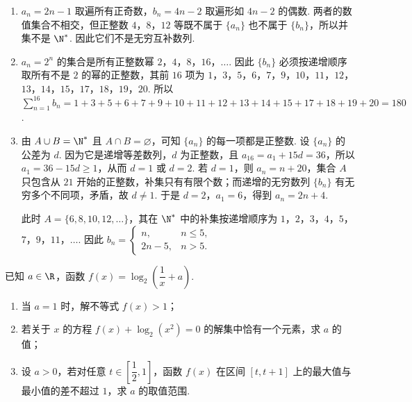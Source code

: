 \begin{solution}
\begin{enumerate}
\item \(a_n=2n-1\) 取遍所有正奇数，\(b_n=4n-2\) 取遍形如 \(4n-2\) 的偶数. 两者的数值集合不相交，但正整数 \(4\)，\(8\)，\(12\) 等既不属于 \(\{a_n\}\) 也不属于 \(\{b_n\}\)，所以并集不是 \(\N^*\). 因此它们不是无穷互补数列.
\item \(a_n=2^n\) 的集合是所有正整数幂 \(2\)，\(4\)，\(8\)，\(16\)，\(\ldots\). 因此 \(\{b_n\}\) 必须按递增顺序取所有不是 \(2\) 的幂的正整数，其前 \(16\) 项为 \(1\)，\(3\)，\(5\)，\(6\)，\(7\)，\(9\)，\(10\)，\(11\)，\(12\)，\(13\)，\(14\)，\(15\)，\(17\)，\(18\)，\(19\)，\(20\). 所以
\(\displaystyle\sum_{n=1}^{16}b_n=1+3+5+6+7+9+10+11+12+13+14+15+17+18+19+20=180\).
\item 由 \(A\cup B=\N^*\) 且 \(A\cap B=\varnothing\)，可知 \(\{a_n\}\) 的每一项都是正整数. 设 \(\{a_n\}\) 的公差为 \(d\). 因为它是递增等差数列，\(d\) 为正整数，且 \(a_{16}=a_1+15d=36\)，所以 \(a_1=36-15d\geqslant1\)，从而 \(d=1\) 或 \(d=2\). 若 \(d=1\)，则 \(a_n=n+20\)，集合 \(A\) 只包含从 \(21\) 开始的正整数，补集只有有限个数；而递增的无穷数列 \(\{b_n\}\) 有无穷多个不同项，矛盾，故 \(d\ne1\). 于是 \(d=2\)，\(a_1=6\)，得到 \(a_n=2n+4\).

此时 \(A=\{6,8,10,12,\ldots\}\)，其在 \(\N^*\) 中的补集按递增顺序为 \(1\)，\(2\)，\(3\)，\(4\)，\(5\)，\(7\)，\(9\)，\(11\)，\(\ldots\). 因此
\(b_n=\begin{cases}
n, & n\leqslant 5,\\
2n-5, & n>5.
\end{cases}\)
\end{enumerate}
\end{solution}

\begin{problem}
已知 \(a\in\R\)，函数 \(f(x)=\log_2\!\left(\dfrac1x+a\right)\).

\begin{enumerate}
\item 当 \(a=1\) 时，解不等式 \(f(x)>1\)；
\item 若关于 \(x\) 的方程 \(f(x)+\log_2(x^2)=0\) 的解集中恰有一个元素，求 \(a\) 的值；
\item 设 \(a>0\)，若对任意 \(t\in\left[\dfrac12,1\right]\)，函数 \(f(x)\) 在区间 \([t,t+1]\) 上的最大值与最小值的差不超过 \(1\)，求 \(a\) 的取值范围.
\end{enumerate}
\end{problem}


